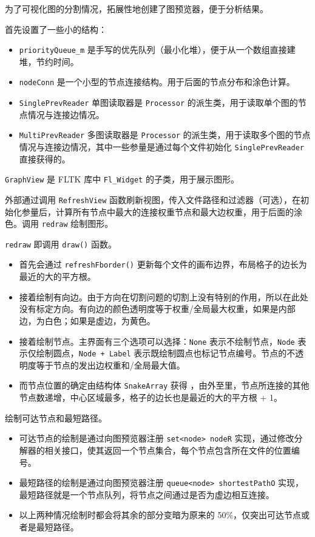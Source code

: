 \documentclass[a4paper,12pt]{article}
\begin{document}
\begin{CJK}{UTF8}{song}
为了可视化图的分割情况，拓展性地创建了图预览器，便于分析结果。

首先设置了一些小的结构：

\begin{itemize}
\item
  \texttt{priorityQueue\_m}
  是手写的优先队列（最小化堆），便于从一个数组直接建堆，节约时间。
\item
  \texttt{nodeConn}
  是一个小型的节点连接结构。用于后面的节点分布和涂色计算。
\item
  \texttt{SinglePrevReader} 单图读取器是 \texttt{Processor}
  的派生类，用于读取单个图的节点情况与连接边情况。
\item
  \texttt{MultiPrevReader} 多图读取器是 \texttt{Processor}
  的派生类，用于读取多个图的节点情况与连接边情况，其中一些参量是通过每个文件初始化
  \texttt{SinglePrevReader} 直接获得的。
\end{itemize}

\texttt{GraphView} 是 FLTK 库中 \texttt{Fl\_Widget}
的子类，用于展示图形。

外部通过调用 \texttt{RefreshView}
函数刷新视图，传入文件路径和过滤器（可选），在初始化参量后，计算所有节点中最大的连接权重节点和最大边权重，用于后面的涂色。调用
\texttt{redraw} 绘制图形。

\texttt{redraw} 即调用 \texttt{draw()} 函数。

\begin{itemize}
\item
  首先会通过 \texttt{refreshFborder()}
  更新每个文件的画布边界，布局格子的边长为最近的大的平方根。
\item
  接着绘制有向边。由于方向在切割问题的切割上没有特别的作用，所以在此处没有标定方向。有向边的颜色透明度等于权重/全局最大权重，如果是内部边，为白色；如果是虚边，为黄色。
\item
  接着绘制节点。主界面有三个选项可以选择：\texttt{None}
  表示不绘制节点，\texttt{Node} 表示仅绘制圆点，\texttt{Node\ +\ Label}
  表示既绘制圆点也标记节点编号。节点的不透明度等于节点的发出边权重和/全局最大值。
\item
  而节点位置的确定由结构体 \texttt{SnakeArray} 获得
  \cite{oj}，由外至里，节点所连接的其他节点数递增，中心区域最多，格子的边长也是最近的大的平方根
  + 1。
\end{itemize}

绘制可达节点和最短路径。

\begin{itemize}
  \item 可达节点的绘制是通过向图预览器注册 \texttt{set<node> nodeR} 实现，通过修改分解器的相关接口，使其返回一个节点集合，每个节点包含所在文件的位置编号。
  \item 最短路径的绘制是通过向图预览器注册 \texttt{queue<node> shortestPathO} 实现，最短路径就是一个节点队列，将节点之间通过是否为虚边相互连接。
  \item 以上两种情况绘制时都会将其余的部分变暗为原来的 50\%，仅突出可达节点或者是最短路径。
\end{itemize}


\end{CJK}
\end{document}
